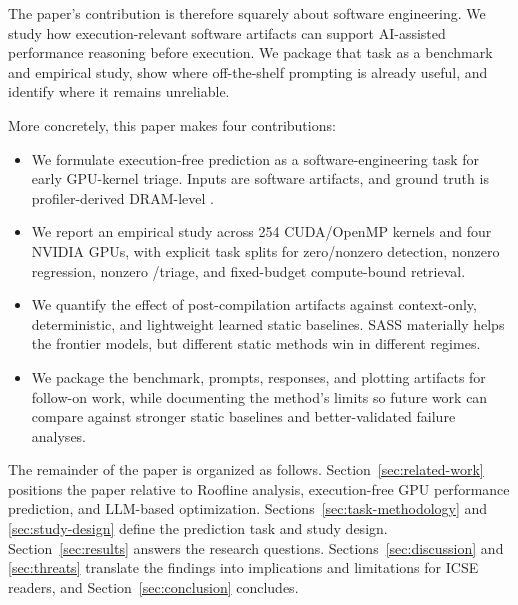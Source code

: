 The paper's contribution is therefore squarely about software engineering.
We study how execution-relevant software artifacts can support AI-assisted performance reasoning before execution.
We package that task as a benchmark and empirical study, show where off-the-shelf prompting is already useful, and identify where it remains unreliable.

More concretely, this paper makes four contributions:
\begin{itemize}[leftmargin=1.2em]
  \item We formulate execution-free \rai prediction as a software-engineering task for early GPU-kernel triage.
  Inputs are software artifacts, and ground truth is profiler-derived DRAM-level \rai.
  \item We report an empirical study across 254 CUDA/OpenMP kernels and four NVIDIA GPUs, with explicit task splits for zero/nonzero detection, nonzero \rai regression, nonzero \bandwidthbound/\computebound triage, and fixed-budget compute-bound retrieval.
  \item We quantify the effect of post-compilation artifacts against context-only, deterministic, and lightweight learned static baselines.
  SASS materially helps the frontier models, but different static methods win in different regimes.
  \item We package the benchmark, prompts, responses, and plotting artifacts for follow-on work, while documenting the method's limits so future work can compare against stronger static baselines and better-validated failure analyses.
\end{itemize}

The remainder of the paper is organized as follows.
Section~\ref{sec:related-work} positions the paper relative to Roofline analysis, execution-free GPU performance prediction, and LLM-based optimization.
Sections~\ref{sec:task-methodology} and \ref{sec:study-design} define the prediction task and study design.
Section~\ref{sec:results} answers the research questions.
Sections~\ref{sec:discussion} and \ref{sec:threats} translate the findings into implications and limitations for ICSE readers, and Section~\ref{sec:conclusion} concludes.
